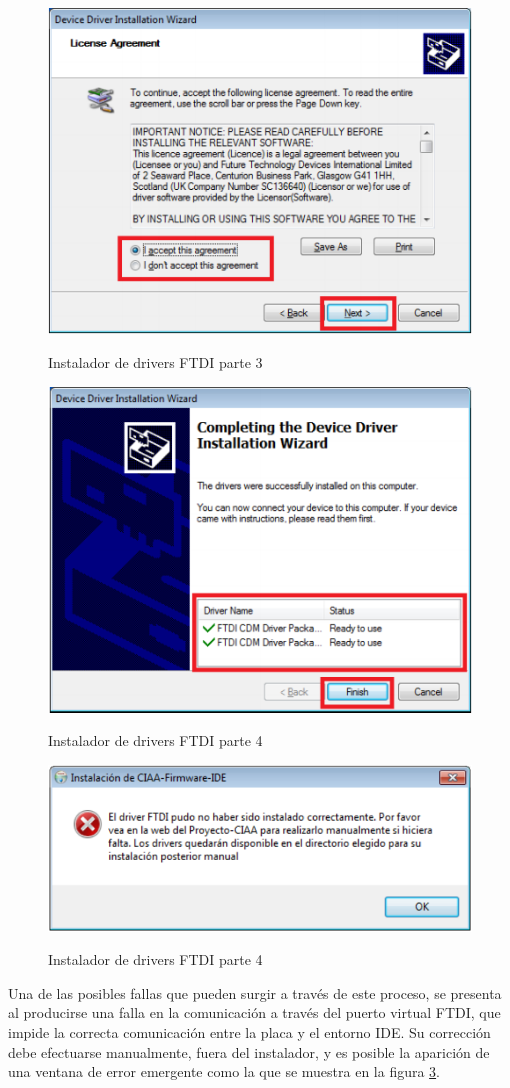 \documentclass[12pt,letterpaper]{article}
\begin{document}
\begin{center}
\begin{figure}[!h]
\centering
\includegraphics[width=6 cm]{figuras/instalacion9.png}\\
\caption{Instalador de drivers FTDI parte 3}
\label{Fig11}
\end{figure}
\end{center}
\begin{center}
\begin{figure}[!h]
\centering
\includegraphics[width=6 cm]{figuras/instalacion10.png}\\
\caption{Instalador de drivers FTDI parte 4}
\label{Fig12}
\end{figure}
\end{center}
\begin{center}
\begin{figure}[!h]
\centering
\includegraphics[width=6 cm]{figuras/instalacion11.png}\\
\caption{Instalador de drivers FTDI parte 4}
\label{Fig13}
\end{figure}
\end{center}

Una de las posibles fallas que pueden surgir a través de este proceso, se presenta al producirse una falla en la comunicación a través del puerto virtual FTDI, que impide la correcta comunicación entre la placa y el entorno IDE. Su corrección debe efectuarse manualmente, fuera del instalador, y es posible la aparición de una ventana de error emergente como la que se muestra en la figura \ref{Fig13}.
\end{document}
